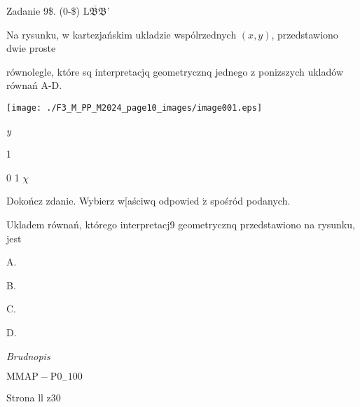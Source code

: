 \documentclass[a4paper,12pt]{article}
\begin{document}
Zadanie 9{\$}. (0-{\$}) $\overline{\mathrm{L}\mathfrak{B}\mathfrak{B}}$'

Na rysunku, w kartezjańskim ukladzie wspólrzednych $(x,y)$, przedstawiono dwie proste

równolegle, które sq interpretacjq geometrycznq jednego z ponizszych ukladów równań A-D.
\begin{center}
\texttt{[image: ./F3\_M\_PP\_M2024\_page10\_images/image001.eps]}
\end{center}
{\it y}

1

0  1  $\chi$

Dokończ zdanie. Wybierz w[aściwq odpowied $\acute{\mathrm{z}}$ spośród podanych.

Ukladem równań, którego interpretacj9 geometrycznq przedstawiono na rysunku, jest

A. 

B. 

C. 

D. 

{\it Brudnopis}

$\mathrm{M}\mathrm{M}\mathrm{A}\mathrm{P}-\mathrm{P}0_{-}100$

Strona ll z30
\end{document}
